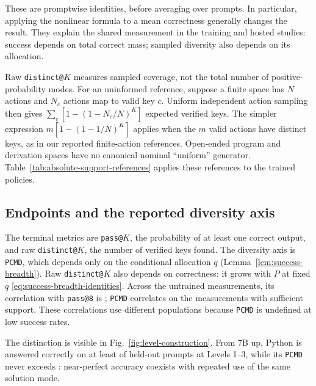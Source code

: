 \documentclass{article}
\newcommand{\1}{\mathbf 1}
\newcommand{\pmd}{\texttt{PCMD}}
\theoremstyle{remark}
\theoremstyle{definition}
\theoremstyle{plain}
\begin{document}
These are promptwise identities, before averaging over prompts. In particular,
applying the nonlinear formula to a mean correctness generally changes the
result. They explain the shared measurement in the training and hosted
studies: success depends on total correct mass; sampled diversity also depends
on its allocation.

Raw \texttt{distinct@}$K$ measures sampled coverage, not the total number of
positive-probability modes. For an uninformed reference, suppose a finite
space has $N$ actions and $N_c$ actions map to valid key $c$. Uniform
independent action sampling then gives $\sum_c[1-(1-N_c/N)^K]$ expected
verified keys. The simpler expression $m[1-(1-1/N)^K]$ applies when the $m$
valid actions have distinct keys, as in our reported finite-action references.
Open-ended program and derivation spaces have no canonical nominal
``uniform'' generator. Table~\ref{tab:absolute-support-references} applies these
references to the trained policies.

\subsection{Endpoints and the reported diversity axis}
\label{app:registered-endpoints}

The terminal metrics are \texttt{pass@}$K$, the probability of at least one
correct output, and raw \texttt{distinct@}$K$, the number of verified keys
found. The diversity axis is \pmd{}, which depends only on the conditional
allocation $q$ (Lemma~\ref{lem:success-breadth}). Raw \texttt{distinct@}$K$
also depends on correctness: it grows with $P$ at fixed $q$
\eqref{eq:success-breadth-identities}. Across the \MDcells{} untrained
measurements, its correlation with \texttt{pass@8} is \MDdistinctcorr{};
\pmd{} correlates \MDpmdcorr{} on the \MDreportable{} measurements with
sufficient support. These correlations use different populations because
\pmd{} is undefined at low success rates.

The distinction is visible in Fig.~\ref{fig:level-construction}. From 7B up,
Python is answered correctly on at least \MDpyPasslo{} of held-out prompts
at Levels 1--3, while its \pmd{} never exceeds \MDpyPmdhi{}: near-perfect
accuracy coexists with repeated use of the same solution mode.
\end{document}
